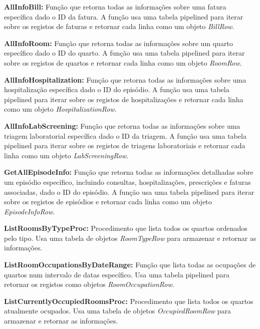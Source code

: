 \vspace{0.15cm}
\textbf{AllInfoBill:} Função que retorna todas as informações sobre uma fatura específica dado o ID da fatura. A função usa uma tabela pipelined para iterar sobre os registos de faturas e retornar cada linha como um objeto \textit{BillRow}.

\vspace{0.15cm}
\textbf{AllInfoRoom:} Função que retorna todas as informações sobre um quarto específico dado o ID do quarto. A função usa uma tabela pipelined para iterar sobre os registos de quartos e retornar cada linha como um objeto \textit{RoomRow}.

\vspace{0.15cm}
\textbf{AllInfoHospitalization:} Função que retorna todas as informações sobre uma hospitalização específica dado o ID do episódio. A função usa uma tabela pipelined para iterar sobre os registos de hospitalizações e retornar cada linha como um objeto \textit{HospitalizationRow}.

\vspace{0.15cm}
\textbf{AllInfoLabScreening:} Função que retorna todas as informações sobre uma triagem laboratorial específica dado o ID da triagem. A função usa uma tabela pipelined para iterar sobre os registos de triagens laboratoriais e retornar cada linha como um objeto \textit{LabScreeningRow}.

\vspace{0.15cm}
\textbf{GetAllEpisodeInfo:} Função que retorna todas as informações detalhadas sobre um episódio específico, incluindo consultas, hospitalizações, prescrições e faturas associadas, dado o ID do episódio. A função usa uma tabela pipelined para iterar sobre os registos de episódios e retornar cada linha como um objeto \textit{EpisodeInfoRow}.

\vspace{0.15cm}
\textbf{ListRoomsByTypeProc:} Procedimento que lista todos os quartos ordenados pelo tipo. Usa uma tabela de objetos \textit{RoomTypeRow} para armazenar e retornar as informações.

\vspace{0.15cm}
\textbf{ListRoomOccupationsByDateRange:} Função que lista todas as ocupações de quartos num intervalo de datas específico. Usa uma tabela pipelined para retornar os registos como objetos \textit{RoomOccupationRow}.

\vspace{0.15cm}
\textbf{ListCurrentlyOccupiedRoomsProc:} Procedimento que lista todos os quartos atualmente ocupados. Usa uma tabela de objetos \textit{OccupiedRoomRow} para armazenar e retornar as informações.


